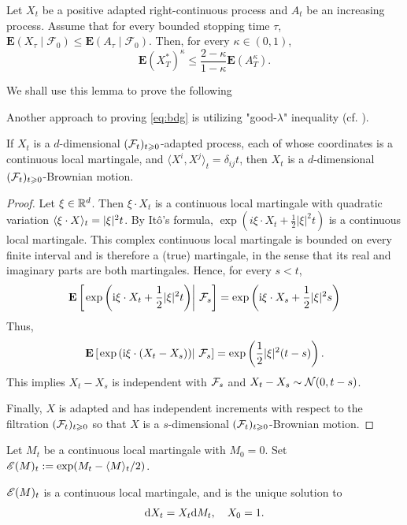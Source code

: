 	\begin{proposition}[Lenglart]
		 Let $X_t$ be a positive adapted right-continuous process and $A_t$ be an increasing process. Assume that for every bounded stopping time $\tau$, $\mathbf{E} (X_\tau \mid \mathcal{F}_0 ) \leq \mathbf{E} (A_\tau \mid \mathcal{F}_0 )$. Then, for every $\kappa \in (0,1)$, 
		 $$
		     \mathbf{E} \left(X_T^* \right)^\kappa  \leq \frac{2-\kappa}{1-\kappa} \mathbf{E} \left( A_T^\kappa\right).
		 $$
	\end{proposition}
	
	We shall use this lemma to prove the following

    
	Another approach to proving \eqref{eq:bdg} is utilizing "good-$\lambda$" inequality (cf. \cite{revuz2013continuous}).   
	\begin{theorem}\label{thm:levy}
		If $X_t$ is a $d$-dimensional $({\mathcal F}_t)_{t\geqslant 0}$-adapted process, each of whose coordinates is a continuous local martingale, and $\langle X^i, X^j \rangle_t=\delta_{ij} t$, then $X_t$ is a $d$-dimensional $({\mathcal F}_t)_{t\geqslant 0}$-Brownian motion.
	\end{theorem}
	\begin{proof}
		Let $\xi\in {\mathbb R}^d$. Then $\xi\cdot X_t$ is a continuous local martingale with quadratic variation $\langle\xi\cdot X\rangle_t= |\xi|^2 t$. By It\^o's formula, $\exp(i\xi\cdot X_t+\frac{1}{2}|\xi|^2 t)$ is a continuous local martingale. This complex continuous local martingale is bounded on every finite interval and is therefore a (true) martingale, in the sense that its real and imaginary parts are
		both martingales. Hence, for every $s<t$, 
		$$
		    {\mathbf E}\left[\left.\exp \left(\mathrm{i} \xi \cdot X_t+\frac{1}{2}|\xi|^2 t\right) \right\rvert\, {{\mathcal F}}_s\right]=\exp \left(\mathrm{i} \xi \cdot X_s+\frac{1}{2}|\xi|^2 s\right)
		$$
		Thus, 
		$$
		    {\mathbf E}\left[\left.\exp \left(\mathrm{i} \xi \cdot (X_t-X_s)\right) \right\rvert\, {{\mathcal F}}_s\right]=\exp \left(\frac{1}{2}|\xi|^2 (t-s)\right). 
		$$
		This implies $X_t-X_s$ is independent with ${\mathcal F}_s$ and $X_t-X_s\sim {\mathcal N}(0, t-s)$. 
		
		Finally, $X$ is adapted and has independent
		increments with respect to the filtration $({\mathcal F}_t)_{t\geqslant 0}$ so that $X$ is a $s$-dimensional $({\mathcal F}_t)_{t\geqslant 0}$-Brownian motion. 
	\end{proof}
	
	Let $M_t$ be a continuous local martingale with $M_0=0$. Set ${\mathscr E}(M)_t:= \exp(M_t-\langle M \rangle_t/2)$. 
	\begin{proposition}
	    ${\mathscr E}(M)_t$ is a continuous local martingale, and is the unique solution to 
		$$
		    \text{\rm{d}} X_t= X_t \text{\rm{d}} M_t, \quad X_0=1. 
		$$
	\end{proposition}
		
